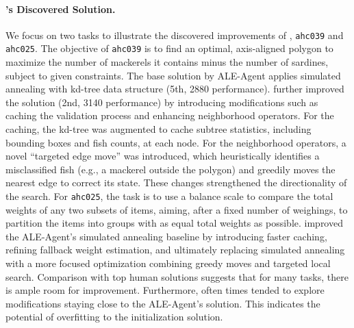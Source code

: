 \paragraph{\ouralgo's Discovered Solution.}
We focus on two tasks to illustrate the discovered improvements of \ouralgo, \texttt{ahc039} and \texttt{ahc025}.
The objective of \texttt{ahc039} is to find an optimal, axis-aligned polygon to maximize the number of mackerels it contains minus the number of sardines, subject to given constraints. The base solution by ALE-Agent applies simulated annealing with kd-tree data structure (5th, 2880 performance). \ouralgo further improved the solution (2nd, 3140 performance) by introducing modifications such as caching the validation process and enhancing neighborhood operators. For the caching, the kd-tree was augmented to cache subtree statistics, including bounding boxes and fish counts, at each node. For the neighborhood operators, a novel ``targeted edge move'' was introduced, which heuristically identifies a misclassified fish (e.g., a mackerel outside the polygon) and greedily moves the nearest edge to correct its state. These changes strengthened the directionality of the search.
For \texttt{ahc025}, the task is to use a balance scale to compare the total weights of any two subsets of items, aiming, after a fixed number of weighings, to partition the items into groups with as equal total weights as possible. \ouralgo improved the ALE-Agent's simulated annealing baseline by introducing faster caching, refining fallback weight estimation, and ultimately replacing simulated annealing with a more focused optimization combining greedy moves and targeted local search. Comparison with top human solutions suggests that for many tasks, there is ample room for improvement. Furthermore, often times \ouralgo tended to explore modifications staying close to the ALE-Agent's solution. This indicates the potential of overfitting to the initialization solution.